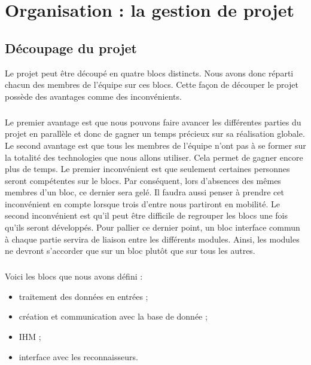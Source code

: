 \chapter{Organisation : la gestion de projet}

\section{Découpage du projet}

Le projet peut être découpé en quatre blocs distincts. Nous avons donc réparti chacun des membres de l’équipe sur ces blocs. Cette façon de découper le projet possède des avantages comme des inconvénients.

\paragraph{}

Le premier avantage est que nous pouvons faire avancer les différentes parties du projet en parallèle et donc de gagner un temps précieux sur sa réalisation globale. Le second avantage est que tous les membres de l’équipe n’ont pas à se former sur la totalité des technologies que nous allons utiliser. Cela permet de gagner encore plus de temps. Le premier inconvénient est que seulement certaines personnes seront compétentes sur le blocs. Par conséquent, lors d’absences des mêmes membres d’un bloc, ce dernier sera gelé. Il faudra aussi penser à prendre cet inconvénient en compte lorsque trois d’entre nous partiront en mobilité. Le second inconvénient est qu’il peut être difficile de regrouper les blocs une fois qu’ils seront développés. Pour pallier ce dernier point, un bloc interface commun à chaque partie servira de liaison entre les différents modules. Ainsi, les modules ne devront s’accorder que sur un bloc plutôt que sur tous les autres.

\paragraph{}

Voici les blocs que nous avons défini :

\begin{itemize}
\item traitement des données en entrées ;
\item création et communication avec la base de donnée ;
\item IHM ;
\item interface avec les reconnaisseurs.
\end{itemize}

